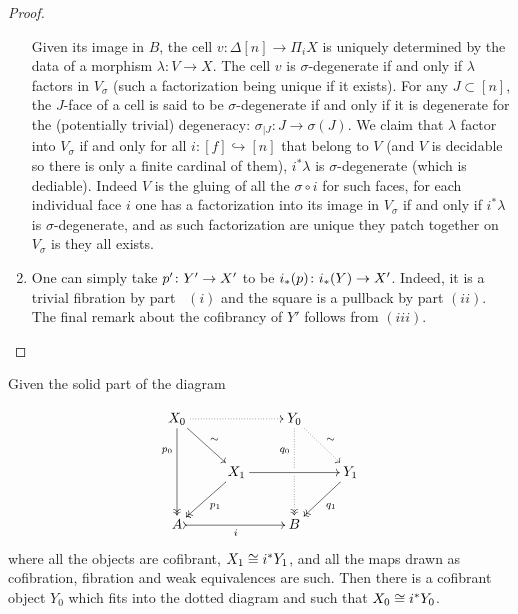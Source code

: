 \documentclass[reqno,10pt,a4paper,oneside,draft]{amsart}
\begin{document}
\begin{proof}
\begin{enumerate}[$(i)$]
Given its image in $B$, the cell $v: \Delta[n] \rightarrow \Pi_i X$ is uniquely determined by the data of a morphism $\lambda: V\rightarrow X$. The cell $v$ is $\sigma$-degenerate if and only if $\lambda$ factors in $V_{\sigma}$ (such a factorization being unique if it exists). For any $J \subset [n]$, the $J$-face of a cell is said to be $\sigma$-degenerate if and only if it is degenerate for the (potentially trivial) degeneracy: $\sigma_{|J} : J \rightarrow \sigma(J)$. We claim that $\lambda$ factor into $V_{\sigma}$ if and only for all $i:[f] \hookrightarrow [n]$ that belong to $V$ (and $V$ is decidable so there is only a finite cardinal of them), $i^* \lambda$ is $\sigma$-degenerate (which is dediable). Indeed $V$ is the gluing of all the $\sigma \circ i$ for such faces, for each individual face $i$ one has a factorization into its image in $V_{\sigma}$ if and only if $i^* \lambda$ is $\sigma$-degenerate, and as such factorization are unique they patch together on $V_{\sigma}$ is they all exists.

\item One can simply take $p' \colon Y' \to X'$ to be $i_*(p) \colon i_*(Y) \to X'$. Indeed, it is a trivial fibration by part~ $(i)$ and the square is a pullback by part $(ii)$. The final remark about the cofibrancy of $Y'$ follows from $(iii)$. \qedhere
\end{enumerate}
\end{proof}





\begin{proposition}
\label{Prop:Homotopy_ext_prop}
Given the solid part of the diagram

\[ 
\xymatrix{
  X_0
  \ar@{.>}[rr]
  \ar[dr]^{\sim}
  \ar@{->>}[dd]_(.3){p_0}
&&
  Y_0
  \ar@{.>}[dr]^{\sim}
  \ar@{.>>}[dd]_(.3){q_0}|{\hole}
&\\&
  X_1
  \ar[rr]
  \ar@{->>}[dl]^{p_1}
&&
  Y_1
  \ar@{->>}[dl]^{q_1}
\\
  A
  \ar@{>->}[rr]_i
&&
  B
&
}
\]
where all the objects are cofibrant, $X_1 \cong i^* Y_1$, and all the maps drawn as cofibration, fibration and weak equivalences are such. Then there is a cofibrant object $Y_0$ which fits into the dotted diagram and such that $X_0 \cong i^* Y_0$.



\end{proposition}
\end{document}
